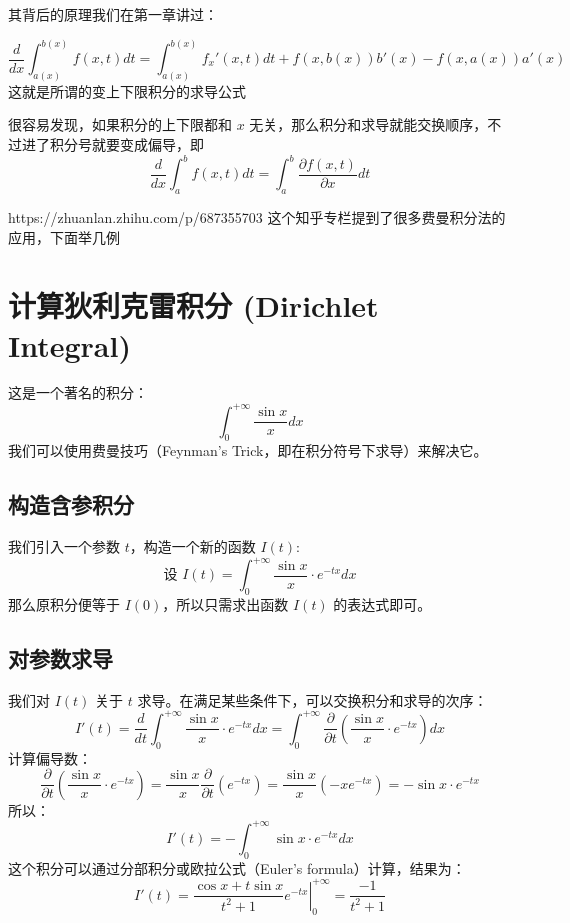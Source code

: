 \documentclass[lang=cn,newtx,10pt,scheme=chinese]{elegantbook}
\begin{document}
其背后的原理我们在第一章讲过：

\begin{equation}
  \frac{d}{dx} \int_{a(x)}^{b(x)} f(x,t) dt=\int_{a(x)}^{b(x)} f_x'(x,t) dt+f(x, b(x)) b'(x)-f(x, a(x)) a'(x)
\end{equation}
这就是所谓的变上下限积分的求导公式

很容易发现，如果积分的上下限都和 $x$ 无关，那么积分和求导就能交换顺序，不过进了积分号就要变成偏导，即
\begin{equation}
  \frac{d}{dx} \int_{a}^{b} f(x,t) dt=\int_{a}^{b} \frac{\partial f(x,t)}{\partial x} dt
\end{equation}

https://zhuanlan.zhihu.com/p/687355703 这个知乎专栏提到了很多费曼积分法的应用，下面举几例

\section*{计算狄利克雷积分 (Dirichlet Integral)}

这是一个著名的积分：
\begin{equation}
\int_{0}^{+\infty} \frac{\sin x}{x} dx
\end{equation}
我们可以使用费曼技巧（Feynman's Trick，即在积分符号下求导）来解决它。

\subsection*{构造含参积分}
我们引入一个参数 $t$，构造一个新的函数 $I(t)$:
\begin{equation}
\text{设 } I(t) = \int_{0}^{+\infty} \frac{\sin x}{x} \cdot e^{-tx} dx
\end{equation}
那么原积分便等于 $I(0)$，所以只需求出函数 $I(t)$ 的表达式即可。

\subsection*{对参数求导}
我们对 $I(t)$ 关于 $t$ 求导。在满足某些条件下，可以交换积分和求导的次序：
\begin{equation}
I'(t) = \frac{d}{dt} \int_{0}^{+\infty} \frac{\sin x}{x} \cdot e^{-tx} dx = \int_{0}^{+\infty} \frac{\partial}{\partial t} \left(\frac{\sin x}{x} \cdot e^{-tx}\right) dx
\end{equation}
计算偏导数：
\begin{equation}
\frac{\partial}{\partial t} \left(\frac{\sin x}{x} \cdot e^{-tx}\right) = \frac{\sin x}{x} \frac{\partial}{\partial t} (e^{-tx}) = \frac{\sin x}{x} (-x e^{-tx}) = -\sin x \cdot e^{-tx}
\end{equation}
所以：
\begin{equation}
I'(t) = -\int_{0}^{+\infty} \sin x \cdot e^{-tx} dx
\end{equation}
这个积分可以通过分部积分或欧拉公式（Euler's formula）计算，结果为：
\begin{equation}
I'(t) = \left. \frac{\cos x + t \sin x}{t^2 + 1} e^{-tx} \right|_{0}^{+\infty} = \frac{-1}{t^2 + 1}
\end{equation}
\end{document}
